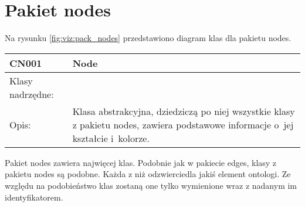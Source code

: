  \newpage

\section{Pakiet nodes}

Na rysunku  \figurename \space \ref{fig:viz:pack_nodes}  przedstawiono diagram klas dla pakietu nodes.


\begin{longtable}{|m{3.5cm}|m{8.5cm}|} \hline

CN001 & Node \\ \hline
Klasy nadrzędne: &     \\ \hline
Opis: & Klasa abstrakcyjna, dziedziczą po niej wszystkie klasy z pakietu nodes,  zawiera podstawowe informacje o~jej kształcie i~kolorze. 
\\ \hline


\end{longtable}


Pakiet nodes zawiera najwięcej klas. Podobnie jak w pakiecie edges, klasy z pakietu nodes są podobne. Każda z niż odzwierciedla jakiś element ontologi.
 Ze względu na podobieństwo klas zostaną one tylko wymienione wraz z nadanym im identyfikatorem. 

